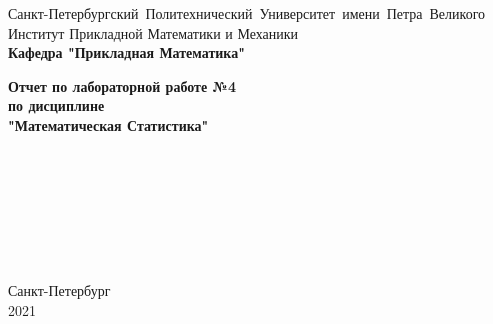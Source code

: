 \documentclass[a4paper]{article}
\author{Тырыкин Я. А. }
\date{March 2021}
\begin{document}
\begin{titlepage}
    \begin{center}
        \mbox{\normalsize{Санкт-Петербургский Политехнический Университет имени Петра Великого}}\\
        \normalsize{Институт Прикладной Математики и Механики}\\
        \large{\textbf{Кафедра "Прикладная Математика"}}
        
        \vfill
        
        \textbf{\Large{Отчет по лабораторной работе №4}}\\
        \textbf{\large{по дисциплине}}\\
        \textbf{\large"Математическая Статистика"}
        
        \vfill
        \\
        \\
        \\
        \\
        \\
        \\
        
    
        
        \vfill
    
    \end{center}
    
    \begin{center} 
        Санкт-Петербург \\
        2021 
    \end{center}
\end{titlepage}
\newpage
\end{document}
